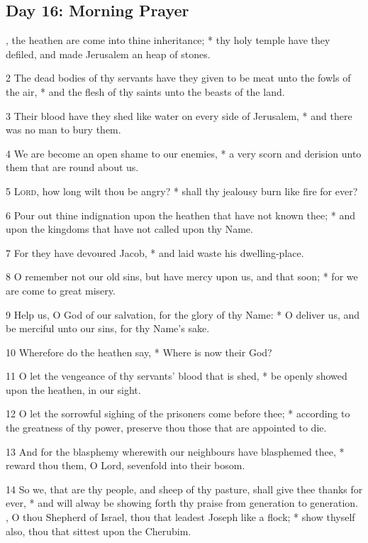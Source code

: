 \subsection{Day 16: Morning Prayer}
, the heathen are come into thine inheritance; * thy holy temple have they defiled, and made Jerusalem an heap of stones.\par
2 The dead bodies of thy servants have they given to be meat unto the fowls of the air, * and the flesh of thy saints unto the beasts of the land.\par
3 Their blood have they shed like water on every side of Jerusalem, * and there was no man to bury them.\par
4 We are become an open shame to our enemies, * a very scorn and derision unto them that are round about us.\par
5 {\textsc{Lord}}, how long wilt thou be angry? * shall thy jealousy burn like fire for ever?\par
6 Pour out thine indignation upon the heathen that have not known thee; * and upon the kingdoms that have not called upon thy Name.\par
7 For they have devoured Jacob, * and laid waste his dwelling-place.\par
8 O remember not our old sins, but have mercy upon us, and that soon; * for we are come to great misery.\par
9 Help us, O God of our salvation, for the glory of thy Name: * O deliver us, and be merciful unto our sins, for thy Name's sake.\par
10 Wherefore do the heathen say, * Where is now their God?\par
11 O let the vengeance of thy servants' blood that is shed, * be openly showed upon the heathen, in our sight.\par
12 O let the sorrowful sighing of the prisoners come before thee; * according to the greatness of thy power, preserve thou those that are appointed to die.\par
13 And for the blasphemy wherewith our neighbours have blasphemed thee, * reward thou them, O Lord, sevenfold into their bosom.\par
14 So we, that are thy people, and sheep of thy pasture, shall give thee thanks for ever, * and will alway be showing forth thy praise from generation to generation.
, O thou Shepherd of Israel, thou that leadest Joseph like a flock; * show thyself also, thou that sittest upon the Cherubim.\par
